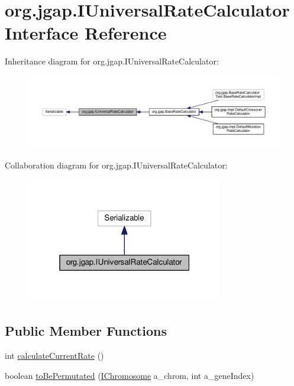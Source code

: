 \hypertarget{interfaceorg_1_1jgap_1_1_i_universal_rate_calculator}{\section{org.\-jgap.\-I\-Universal\-Rate\-Calculator Interface Reference}
\label{interfaceorg_1_1jgap_1_1_i_universal_rate_calculator}
}


Inheritance diagram for org.\-jgap.\-I\-Universal\-Rate\-Calculator\-:
\nopagebreak
\begin{figure}[H]
\begin{center}
\leavevmode
\includegraphics[width=350pt]{interfaceorg_1_1jgap_1_1_i_universal_rate_calculator__inherit__graph}
\end{center}
\end{figure}


Collaboration diagram for org.\-jgap.\-I\-Universal\-Rate\-Calculator\-:
\nopagebreak
\begin{figure}[H]
\begin{center}
\leavevmode
\includegraphics[width=244pt]{interfaceorg_1_1jgap_1_1_i_universal_rate_calculator__coll__graph}
\end{center}
\end{figure}
\subsection*{Public Member Functions}
\begin{DoxyCompactItemize}
\item 
int \hyperlink{interfaceorg_1_1jgap_1_1_i_universal_rate_calculator_ae57319a9082d3a33ecb401d352404ce5}{calculate\-Current\-Rate} ()
\item 
boolean \hyperlink{interfaceorg_1_1jgap_1_1_i_universal_rate_calculator_aa2e90d38b67668a3bbf80820293269c0}{to\-Be\-Permutated} (\hyperlink{interfaceorg_1_1jgap_1_1_i_chromosome}{I\-Chromosome} a\-\_\-chrom, int a\-\_\-gene\-Index)
\end{DoxyCompactItemize}
